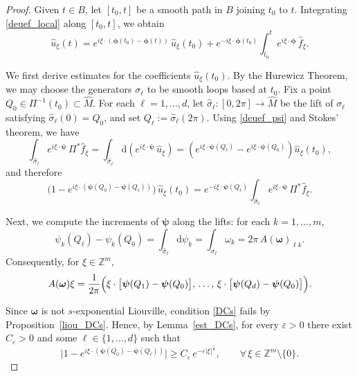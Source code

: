 \documentclass[11pt,reqno]{amsart}
\numberwithin{equation}{section}
\begin{document}
\begin{proof}
	Given \(t\in B\), let \([t_0,t]\) be a smooth path in \(B\) joining \(t_0\) to \(t\).
	Integrating \eqref{deuef_local} along \([t_0,t]\), we obtain
	\begin{equation*}
		\widehat{u}_\xi(t)
		=
		e^{i\xi\cdot (\boldsymbol{\phi}(t_0)-\boldsymbol{\phi}(t))}\,\widehat{u}_\xi(t_0)
		+
		e^{-i\xi\cdot\boldsymbol{\phi}(t_0)}
		\int_{t_0}^{t} e^{i\xi\cdot\boldsymbol{\phi}}\,\widehat{f}_\xi .
	\end{equation*}
	
	We first derive estimates for the coefficients \(\widehat{u}_\xi(t_0)\).
	By the Hurewicz Theorem, we may choose the generators \(\sigma_\ell\) to be smooth loops based at \(t_0\).
	Fix a point \(Q_0\in \Pi^{-1}(t_0)\subset \hat M\).
	For each \(\ell=1,\dots,d\), let \(\hat\sigma_\ell:[0,2\pi]\to \hat M\) be the lift of \(\sigma_\ell\) satisfying \(\hat\sigma_\ell(0)=Q_0\),
	and set \(Q_\ell:=\hat\sigma_\ell(2\pi)\).
	Using \eqref{deuef_psi} and Stokes' theorem, we have
	\begin{equation*}
		\int_{\hat\sigma_\ell} e^{i\xi\cdot\boldsymbol{\psi}}\,\Pi^*\widehat{f}_\xi
		= \int_{\hat\sigma_\ell} \mathrm{d}\!\left(e^{i\xi\cdot\boldsymbol{\psi}}\,\widehat{u}_\xi\right)
		= \left(e^{i\xi\cdot\boldsymbol{\psi}(Q_\ell)} - e^{i\xi\cdot\boldsymbol{\psi}(Q_0)}\right)\widehat{u}_\xi(t_0),
	\end{equation*}
	and therefore
	\begin{equation}\label{u_t0_loop}
		\bigl(1-e^{i\xi\cdot(\boldsymbol{\psi}(Q_0)-\boldsymbol{\psi}(Q_\ell))}\bigr)\,\widehat{u}_\xi(t_0)
		= e^{-i\xi\cdot\boldsymbol{\psi}(Q_\ell)} \int_{\hat\sigma_\ell} e^{i\xi\cdot\boldsymbol{\psi}}\,\Pi^*\widehat{f}_\xi .
	\end{equation}
	
	Next, we compute the increments of \(\boldsymbol{\psi}\) along the lifts:
	for each \(k=1,\dots,m\),
	\[
	\psi_k(Q_\ell)-\psi_k(Q_0) = \int_{\hat\sigma_\ell}\mathrm{d}\psi_k
	= \int_{\sigma_\ell}\omega_k
	= 2\pi\,A(\boldsymbol{\omega})_{\ell k}.
	\]
	Consequently, for \(\xi\in\mathbb{Z}^m\),
	\[
	A(\boldsymbol{\omega})\xi
	= \frac1{2\pi}\Bigl( \xi\cdot\bigl[\boldsymbol{\psi}(Q_1)-\boldsymbol{\psi}(Q_0)\bigr],
	\,\dots,\, \xi\cdot\bigl[\boldsymbol{\psi}(Q_d)-\boldsymbol{\psi}(Q_0)\bigr]
	\Bigr).
	\]
	
	Since \(\boldsymbol{\omega}\) is not \(s\)-exponential Liouville, condition \eqref{DCs} fails by Proposition~\ref{liou_DCs}.
	Hence, by Lemma~\ref{est_DCs}, for every \(\varepsilon>0\) there exist \(C_\varepsilon>0\) and some \(\ell\in\{1,\dots,d\}\) such that
	\begin{equation}\label{est_exp}
		\bigl|1-e^{i\xi\cdot(\boldsymbol{\psi}(Q_0)-\boldsymbol{\psi}(Q_\ell))}\bigr|
		\geq C_\varepsilon\,e^{-\varepsilon|\xi|^{\frac1s}},
		\qquad \forall\,\xi\in\mathbb{Z}^m\setminus\{0\}.
	\end{equation}
	

\end{proof}
\end{document}

